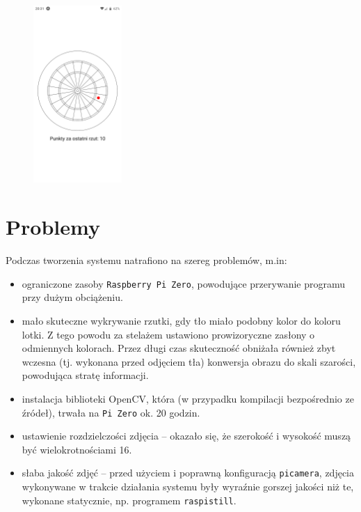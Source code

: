 \begin{figure}[h!]
\begin{center}
\includegraphics[width=0.3\textwidth]{obrazki/screenshot.png}
\end{center}
\label{screenshot}
\end{figure} 

\section{Problemy}
Podczas tworzenia systemu natrafiono na szereg problemów, m.in:
\begin{itemize}
  \item ograniczone zasoby \verb|Raspberry Pi Zero|, powodujące przerywanie programu przy dużym obciążeniu.
  \item mało skuteczne wykrywanie rzutki, gdy tło miało podobny kolor do koloru lotki. Z tego powodu za stelażem ustawiono prowizoryczne zasłony o odmiennych kolorach. Przez długi czas skuteczność obniżała również zbyt wczesna (tj. wykonana przed odjęciem tła) konwersja obrazu do skali szarości, powodująca stratę informacji.
  \item instalacja biblioteki OpenCV, która (w przypadku kompilacji bezpośrednio ze źródeł), trwała na \verb|Pi Zero| ok. 20 godzin.
  \item ustawienie rozdzielczości zdjęcia -- okazało się, że szerokość i wysokość muszą być wielokrotnościami 16.
  \item słaba jakość zdjęć -- przed użyciem i poprawną konfiguracją \verb|picamera|, zdjęcia wykonywane w trakcie działania systemu były wyraźnie gorszej jakości niż te, wykonane statycznie, np. programem \verb|raspistill|.
\end{itemize}
